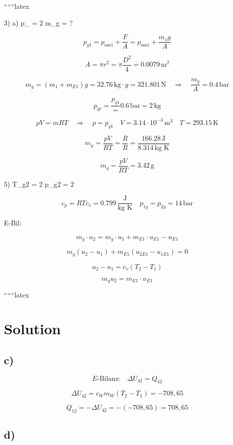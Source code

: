 
``````latex


3) a) \quad p_{} = 2 \quad m_{g} = ?

\[
p_{g1} = p_{\text{om1}} + \frac{F}{A} = p_{\text{om1}} + \frac{m_{s}g}{A}
\]

\[
A = \pi r^2 = \pi \frac{D^2}{4} = 0.0079 \, \text{m}^2
\]

\[
m_{g} = (m_{1} + m_{E1}) g = 32.76 \, \text{kg} \cdot g = 321.801 \, \text{N} \quad \Rightarrow \quad \frac{m_{g}}{A} = 0.4 \, \text{bar}
\]

\[
p_{\text{gr}} = \frac{p_{g1}} = 0.6 \, \text{bar} = 2 \, \text{kg}
\]

\[
p V = m R T \quad \Rightarrow \quad p = p_{g1} \quad V = 3.14 \cdot 10^{-3} \, \text{m}^3 \quad T = 293.15 \, \text{K}
\]

\[
m_{g} = \frac{p V}{R T} = \frac{R}{R} = \frac{166.28 \, \text{J}}{8.314 \, \text{kg K}}
\]

\[
m_{g} = \frac{p V}{R T} = 3.42 \, \text{g}
\]

5) \quad T_{g2} = 2 \quad p_{g2} = 2

\[
c_{p} = R T c_{v} = 0.799 \, \frac{\text{J}}{\text{kg K}} \quad p_{1g} = p_{2g} = 14 \, \text{bar}
\]

E-Bil:

\[
m_{g} \cdot u_{2} = m_{g} \cdot u_{1} + m_{E1} \cdot u_{E1} - u_{E1}
\]

\[
m_{g} (u_{2} - u_{1}) + m_{E1} (u_{2E1} - u_{1E1}) = 0
\]

\[
u_{2} - u_{1} = c_{v} (T_{2} - T_{1})
\]

\[
m_{g} u_{2} = m_{E1} \cdot u_{E1}
\]

``````latex


\section*{Solution}

\subsection*{c)}

\[
E\text{-Bilanz:} \quad \Delta U_{42} = Q_{42}
\]

\[
\Delta U_{42} = c_{W} m_{W} (T_{2} - T_{1}) = -708,65
\]

\[
Q_{12} = -\Delta U_{42} = -(-708,65) = 708,65
\]

\subsection*{d)}

